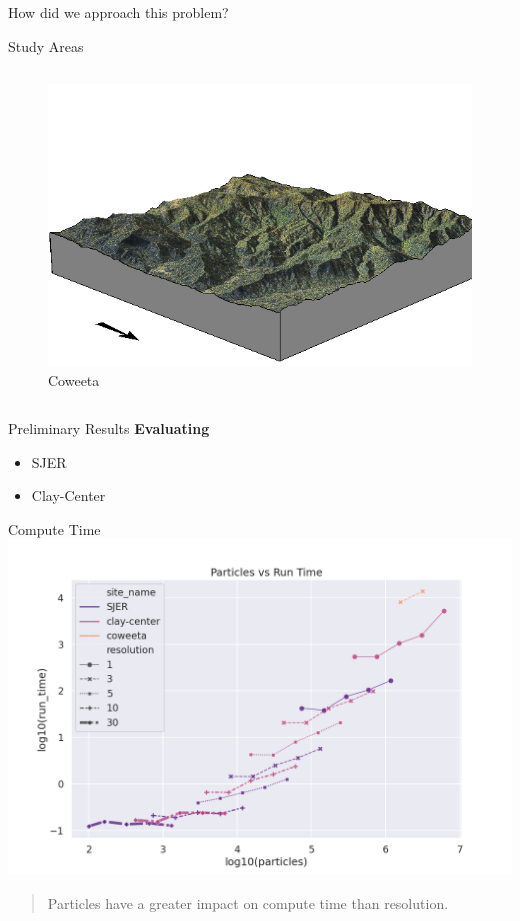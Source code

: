 \documentclass[
  ignorenonframetext,
]{beamer}
\providecommand{\tightlist}{%
  \setlength{\itemsep}{0pt}\setlength{\parskip}{0pt}}\usepackage{longtable,booktabs,array}
\begin{document}
\begin{frame}[fragile]{How did we approach this problem?}
\begin{block}{Study Areas}
\begin{columns}[T]
\begin{column}{0.6\textwidth}
\begin{figure}[H]
{\centering \includegraphics{../output/coweeta/elevation_3dmap.png}

}

\caption{Coweeta}

\end{figure}%
\end{column}
\end{columns}
\end{block}

\begin{block}{Preliminary Results}
\label{preliminary-results}
\textbf{Evaluating}

\begin{itemize}
\tightlist
\item
  SJER
\item
  Clay-Center
\end{itemize}
\end{block}

\begin{block}{Compute Time}
\label{compute-time}
\includegraphics{../output/agu2024_particles_run_time.png}

\begin{quote}
Particles have a greater impact on compute time than resolution.
\end{quote}
\end{block}
\end{frame}
\end{document}
